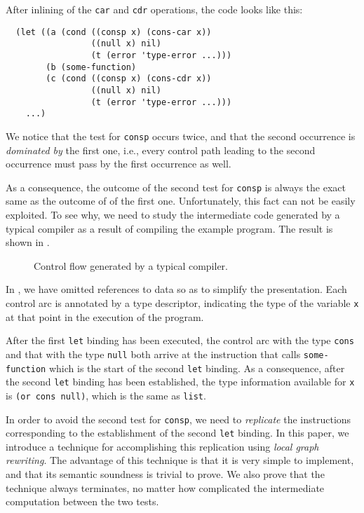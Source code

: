 After inlining of the \texttt{car} and \texttt{cdr} operations, the
code looks like this:

\begin{verbatim}
  (let ((a (cond ((consp x) (cons-car x))
                 ((null x) nil)
                 (t (error 'type-error ...)))
        (b (some-function)
        (c (cond ((consp x) (cons-cdr x))
                 ((null x) nil)
                 (t (error 'type-error ...)))
    ...)
\end{verbatim}

We notice that the test for \texttt{consp} occurs twice, and that the
second occurrence is \emph{dominated by} the first one, i.e., every
control path leading to the second occurrence must pass by the first
occurrence as well.

As a consequence, the outcome of the second test for \texttt{consp} is
always the exact same as the outcome of of the first one.
Unfortunately, this fact can not be easily exploited.  To see why, we
need to study the intermediate code generated by a typical compiler as
a result of compiling the example program.  The result is shown in
.

\begin{figure}
\begin{center}
\end{center}
\caption{\label{fig-example-naive}
Control flow generated by a typical compiler.}
\end{figure}

In , we have omitted references to data so
as to simplify the presentation.  Each control arc is annotated by a
type descriptor, indicating the type of the variable \texttt{x} at
that point in the execution of the program.

After the first \texttt{let} binding has been executed, the control
arc with the type \texttt{cons} and that with the type \texttt{null}
both arrive at the instruction that calls \texttt{some-function} which
is the start of the second \texttt{let} binding.  As a consequence,
after the second \texttt{let} binding has been established, the type
information available for \texttt{x} is \texttt{(or cons null)}, which
is the same as \texttt{list}.

In order to avoid the second test for \texttt{consp}, we need to
\emph{replicate} the instructions corresponding to the establishment
of the second \texttt{let} binding.  In this paper, we introduce a
technique for accomplishing this replication using \emph{local graph
  rewriting}.  The advantage of this technique is that it is very
simple to implement, and that its semantic soundness is trivial to
prove.  We also prove that the technique always terminates, no matter
how complicated the intermediate computation between the two tests.
